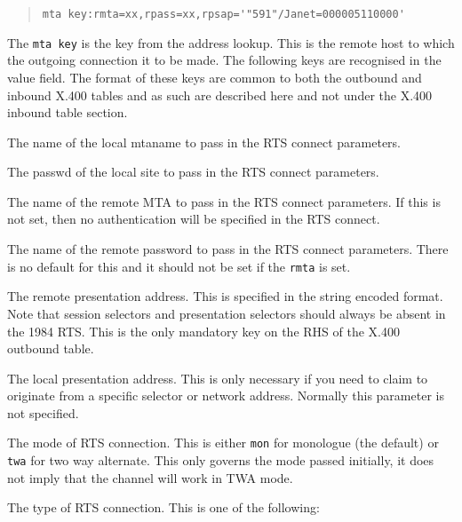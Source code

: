 \begin{quote}\small\begin{verbatim}
mta key:rmta=xx,rpass=xx,rpsap='"591"/Janet=000005110000'
\end{verbatim}\end{quote}

The \verb+mta key+ is the key from the address lookup. This is the
remote host to which the outgoing connection it to be made.
The following keys are recognised in the value field.
The format of these keys are common to both the outbound and inbound
X.400 tables and as such are described here and not under the X.400
inbound table section.

\begin{describe}
\item[\verb+lmta+:]	The name of the local mtaname to pass in the
RTS connect parameters.

\item[\verb+lpass+:]	The passwd of the local site to pass in the
RTS connect parameters.

\item[\verb+rmta+:]	The name of the remote MTA to pass in the RTS
connect parameters. If this is not set, then no authentication will be
specified in the RTS connect.

\item[\verb+rpass+:]	The name of the remote password to pass in the
RTS connect parameters. There is no default for this and it should 
not be set if the \verb+rmta+ is set.

\item[\verb+rpsap+:]	The remote presentation address. This is
specified in the string encoded format. Note that session selectors
and presentation selectors should always be absent in the 1984 RTS.
This is the only mandatory key on the RHS of the X.400 outbound table.

\item[\verb+lpsap+:]	The local presentation address. This is only
necessary if you need to claim to originate from a specific selector
or network address. Normally this parameter is not specified.

\item[\verb+mode+:]	The mode of RTS connection. This is either
\verb+mon+ for monologue (the default) or \verb+twa+ for two way
alternate. This only governs the mode passed initially, it does not
imply that the channel will work in TWA mode.

\item[\verb+type+:]	The type of RTS connection. This is one of the
following:


\end{describe}
